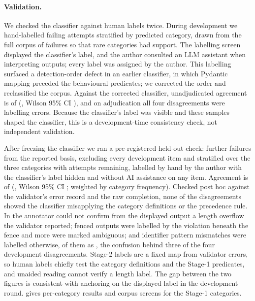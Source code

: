 \begin{table}[!htbp]
\centering\small
\caption{Primary categories on the reporting basis.}
\label{tab:categories}

\end{table}

\paragraph{Validation.}
We checked the classifier against human labels twice. During development
we hand-labelled  failing attempts stratified by
predicted category, drawn from the full corpus of 
failures so that rare categories had support. The labelling screen
displayed the classifier's label, and the author consulted an LLM
assistant when interpreting outputs; every label was assigned by the
author. This labelling surfaced a detection-order defect in an earlier
classifier, in which Pydantic mapping preceded the behavioural
predicates; we corrected the order and reclassified the corpus. Against
the corrected classifier, unadjudicated agreement is
 of 
(, Wilson 95\% CI ),
and on adjudication all four disagreements were labelling errors. Because
the classifier's label was visible and these samples shaped the
classifier, this is a development-time consistency check, not
independent validation.

After freezing the classifier we ran a pre-registered held-out check:
 further failures from the reported basis, excluding every
development item and stratified over the three categories with attempts
remaining, labelled by hand by the author with the classifier's label
hidden and without AI assistance on any item. Agreement is
 of  (, Wilson 95\% CI
;  weighted by category
frequency). Checked post hoc against the validator's error record and the
raw completion, none of the  disagreements showed
the classifier misapplying the category definitions or the precedence
rule. In  the annotator could not
confirm from the displayed output a length overflow the validator
reported;  fenced outputs were labelled
by the violation beneath the fence and 
more were marked ambiguous; and 
identifier pattern mismatches were labelled otherwise,
 of them as , the
confusion behind three of the four development disagreements. Stage-2
labels are a fixed map from validator errors, so human labels chiefly
test the category definitions and the Stage-1 predicates, and unaided
reading cannot verify a length label. The gap between the two figures is
consistent with anchoring on the displayed label in the development
round.  gives per-category results and corpus
screens for the Stage-1 categories.